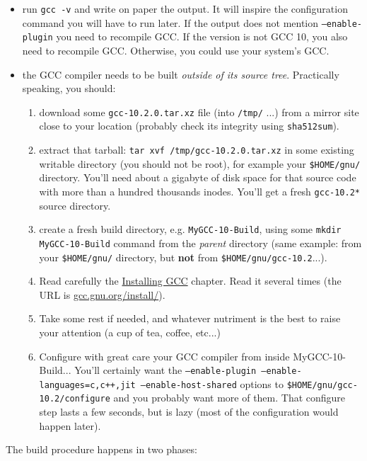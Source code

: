 \begin{appendices}
\begin{itemize}
\item run \texttt{gcc -v} and write on paper the output. It will
  inspire the configuration command you will have to run later. If the
  output does not mention \texttt{--enable-plugin} you need to
  recompile GCC. If the version is not GCC 10, you also need to
  recompile GCC. Otherwise, you could use your system's GCC.

\item the GCC compiler needs to be built \textit{outside of its source tree}. Practically speaking, you should:
  \begin{enumerate}
  \item download some \texttt{gcc-10.2.0.tar.xz} file (into \texttt{/tmp/} ...) from a mirror site close to your location (probably check its integrity using \texttt{sha512sum}).
  \item extract that tarball: \texttt{tar xvf /tmp/gcc-10.2.0.tar.xz}
    in some existing writable directory (you should not be root), for example your \texttt{\$HOME/gnu/} directory. You'll need
    about a gigabyte of disk space for that source code with more than
    a hundred thousands inodes. You'll get a fresh \texttt{gcc-10.2*}
    source directory.
  \item create a fresh build directory, e.g. \texttt{MyGCC-10-Build},
    using some \texttt{mkdir MyGCC-10-Build} command from the
    \textit{parent} directory (same example: from your
    \texttt{\$HOME/gnu/} directory, but \textbf{not} from
    \texttt{\$HOME/gnu/gcc-10.2}...).
  \item Read carefully the \href{https://gcc.gnu.org/install/}{Installing GCC} chapter. Read it several times (the URL is \href{https://gcc.gnu.org/install/}{gcc.gnu.org/install/}).
  \item Take some rest if needed, and whatever nutriment is the best
    to raise your attention (a cup of tea, coffee, etc...)
  \item Configure with great care your GCC compiler from inside
    {MyGCC-10-Build}... You'll certainly want the
    \texttt{--enable-plugin --enable-languages=c,c++,jit
      --enable-host-shared} options to
    \texttt{\$HOME/gnu/gcc-10.2/configure} and you probably want more
    of them. That configure step lasts a few seconds, but is lazy
    (most of the configuration would happen later).
  \end{enumerate}

  
\end{itemize}
\medskip

The build procedure happens in two phases:


\end{appendices}
